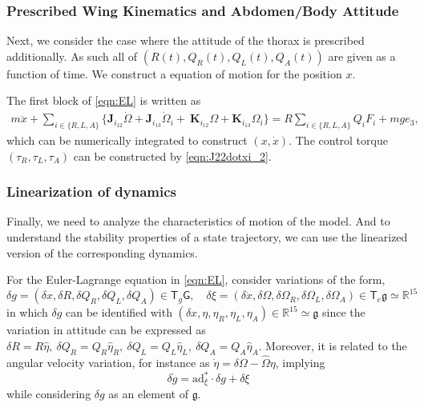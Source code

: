 \documentclass[10pt]{article}
\newcommand{\T}{\ensuremath{\mathsf{T}}}
\newcommand{\ad}{\ensuremath{\mathrm{ad}}}
\newcommand{\G}{\ensuremath{\mathsf{G}}}
\newcommand{\g}{\ensuremath{\mathfrak{g}}}
\begin{document}
\subsubsection{Prescribed Wing Kinematics and Abdomen/Body Attitude}

Next, we consider the case where the attitude of the thorax is prescribed additionally. 
As such all of $(R(t),Q_R(t),Q_L(t),Q_A(t))$ are given as a function of time.
We construct a equation of motion for the position $x$. 

The first block of \eqref{eqn:EL} is written as
\begin{align}
    m\ddot x + 
    \sum_{i\in\{R,L,A\}} \big\{ \mathbf{J}_{i_{12}} \dot\Omega + \mathbf{J}_{i_{13}}\dot\Omega_i 
    + \ \mathbf{K}_{i_{12}}\Omega + \mathbf{K}_{i_{13}}\Omega_i \big\} = R\sum_{i\in\{R,L,A\}} Q_i F_i + mg e_3,\label{eqn:mx_ddot}
\end{align}
which can be numerically integrated to construct $(x,\dot x)$. 
The control torque $(\tau_R,\tau_L,\tau_A)$ can be constructed by \eqref{eqn:J22dotxi_2}.

\subsubsection{Linearization of dynamics}
Finally, we need to analyze the characteristics of motion of the model. And to understand the stability properties of a state trajectory, we can use the linearized version of the corresponding dynamics.

For the Euler-Lagrange equation in \eqref{eqn:EL}, consider variations of the form,
\[ \delta g = (\delta x, \delta R, \delta Q_R, \delta Q_L, \delta Q_A) \in \T_{g}\G, \quad \delta \xi = (\delta \dot{x}, \delta\Omega, \delta\Omega_R, \delta\Omega_L, \delta\Omega_A) \in \T_e \g \simeq \mathbb{R}^{15} \]
in which $ \delta g $ can be identified with $ (\delta x, \eta, \eta_R, \eta_L, \eta_A) \in \mathbb{R}^{15} \simeq \g $ since the variation in attitude can be expressed as $ \delta R = R \hat{\eta},\ \delta Q_R = Q_R \hat{\eta}_R,\ \delta Q_L = Q_L \hat{\eta}_L,\ \delta Q_A = Q_A \hat{\eta}_A $. Moreover, it is related to the angular velocity variation, for instance as $ \dot{\eta} = \delta\Omega - \hat{\Omega} \eta $, implying
\begin{equation*}
	\delta \dot{g} = \ad^*_{\xi} \cdot \delta g + \delta \xi
\end{equation*}
while considering $ \delta g $ as an element of $ \g $.
\end{document}
